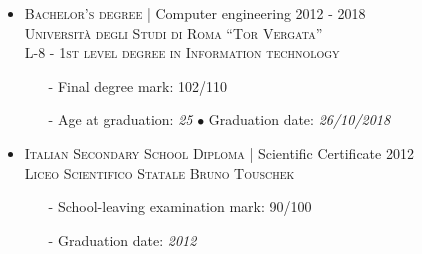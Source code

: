 \documentclass[english,10pt,a4paper]{article}
\newcommand{\CompanyName}[1]{\textsc{{\small #1}}}
\newcommand{\JobTimeRange}[1]{{\footnotesize \textcolor{CvColor!50}{\faCalendar*} \hspace{0.01cm} #1}}
\newcommand{\CvBullet}{\hspace{0.05cm} \textcolor{CvColor}{$\bullet$} \hspace{0.05cm}}
\begin{document}
\begin{paracol}{2}
\begin{tcolorbox}[colback=white, height=\textheight, colframe=white, left=0cm]
\begin{itemize}
	\vspace*{0.2cm}
	
	\item \CompanyName{Bachelor's degree} \textcolor{CvColor}{|} {\scriptsize Computer engineering} \hfill \JobTimeRange{2012 - 2018}\\
	{\scriptsize \textcolor{CvIcon}{\textsc{Università degli Studi di Roma ``Tor Vergata''}}} \\
	{\scriptsize \textcolor{CvIcon}{\textsc{L-8 - 1st level degree in Information technology}}}
	{\scriptsize \begin{itemize}
			\item[-] Final degree mark: \textcolor{CvColor}{102/110}
			\item[-] Age at graduation: \textit{25} \CvBullet Graduation date: \textit{26/10/2018}	
	\end{itemize}}

	\vspace*{0.2cm}

	\item \CompanyName{Italian Secondary School Diploma} \textcolor{CvColor}{|} {\scriptsize Scientific Certificate} \hfill \JobTimeRange{2012}\\
	{\scriptsize \textcolor{CvIcon}{\textsc{Liceo Scientifico Statale Bruno Touschek}}} 
	{\scriptsize \begin{itemize}
			\item[-] School-leaving examination mark: \textcolor{CvColor}{90/100}
			\item[-] Graduation date: \textit{2012}
	\end{itemize}}
	
\end{itemize}


\end{tcolorbox}
\end{paracol}
\newpage
\end{document}
